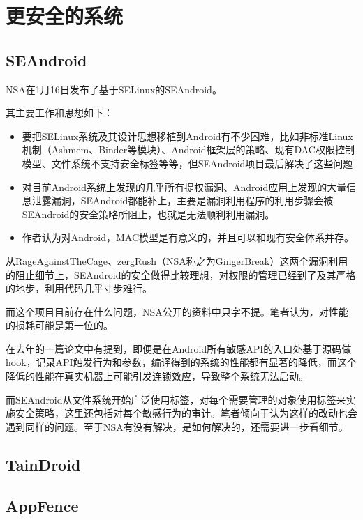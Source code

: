 \section{更安全的系统}
\subsection{SEAndroid}
NSA在1月16日发布了基于SELinux的SEAndroid\cite{url:seandroid}。

其主要工作和思想如下：

\begin{itemize}
  \item 要把SELinux系统及其设计思想移植到Android有不少困难，比如非标准Linux机制（Ashmem、Binder等模块）、Android框架层的策略、现有DAC权限控制模型、文件系统不支持安全标签等等，但SEAndroid项目最后解决了这些问题
  \item 对目前Android系统上发现的几乎所有提权漏洞、Android应用上发现的大量信息泄露漏洞，SEAndroid都能补上，主要是漏洞利用程序的利用步骤会被SEAndroid的安全策略所阻止，也就是无法顺利利用漏洞。
  \item 作者认为对Android，MAC模型是有意义的，并且可以和现有安全体系并存。
\end{itemize}

从RageAgainstTheCage、zergRush（NSA称之为GingerBreak）这两个漏洞利用的阻止细节上，SEAndroid的安全做得比较理想，对权限的管理已经到了及其严格的地步，利用代码几乎寸步难行。

而这个项目目前存在什么问题，NSA公开的资料中只字不提。笔者认为，对性能的损耗可能是第一位的。

在去年的一篇论文中有提到，即便是在Android所有敏感API的入口处基于源码做hook，记录API触发行为和参数，编译得到的系统的性能都有显著的降低，而这个降低的性能在真实机器上可能引发连锁效应，导致整个系统无法启动。

而SEAndroid从文件系统开始广泛使用标签，对每个需要管理的对象使用标签来实施安全策略，这里还包括对每个敏感行为的审计。笔者倾向于认为这样的改动也会遇到同样的问题。至于NSA有没有解决，是如何解决的，还需要进一步看细节。

\subsection{TainDroid}

\subsection{AppFence}
